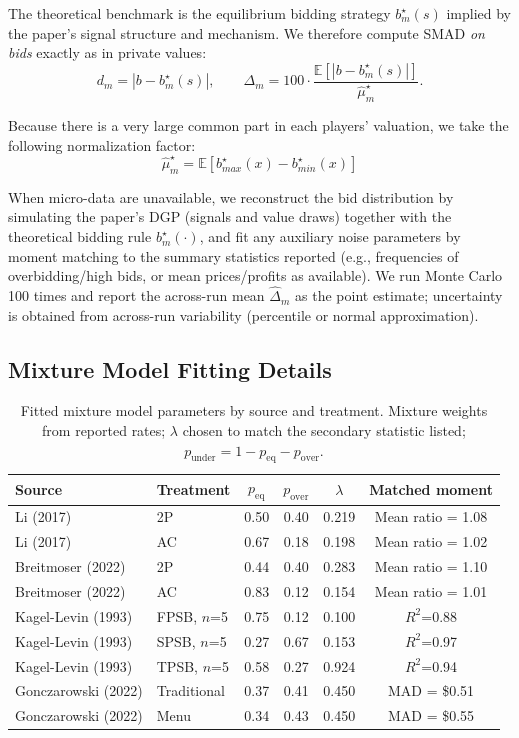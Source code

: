 \documentclass{article} %
\begin{document}
The theoretical benchmark is the equilibrium bidding strategy $b_m^\star(s)$ implied by the paper's signal structure and mechanism. We therefore compute SMAD \emph{on bids} exactly as in private values:
\[
d_m = |b - b_m^\star(s)|,
\qquad
\Delta_m = 100\cdot \frac{\mathbb E[|b-b_m^\star(s)|]}{\widehat{\mu}_m^\star}.
\]

Because there is a very large common part in each players' valuation, we take the following normalization factor:
\[
{\widehat{\mu}_m^\star} = \mathbb E[b^\star_{max}(x) - b^\star_{min}(x)]
\]

When micro-data are unavailable, we reconstruct the bid distribution by simulating the paper's DGP (signals and value draws) together with the theoretical bidding rule $b_m^\star(\cdot)$, and fit any auxiliary noise parameters by moment matching to the summary statistics reported (e.g., frequencies of overbidding/high bids, or mean prices/profits as available). We run Monte Carlo 100 times and report the across-run mean $\widehat{\Delta}_m$ as the point estimate; uncertainty is obtained from across-run variability (percentile or normal approximation).

\subsection{Mixture Model Fitting Details}\label{app:mixture}

\begin{table}[h]
\centering
\small
\begin{tabular}{llcccc}
\toprule
Source & Treatment & $p_{\text{eq}}$ & $p_{\text{over}}$ & $\lambda$ & Matched moment \\
\midrule
Li (2017) & 2P & 0.50 & 0.40 & 0.219 & Mean ratio = 1.08 \\
Li (2017) & AC & 0.67 & 0.18 & 0.198 & Mean ratio = 1.02 \\
Breitmoser (2022) & 2P & 0.44 & 0.40 & 0.283 & Mean ratio = 1.10 \\
Breitmoser (2022) & AC & 0.83 & 0.12 & 0.154 & Mean ratio = 1.01 \\
Kagel-Levin (1993) & FPSB, $n$=5 & 0.75 & 0.12 & 0.100 & $R^2$=0.88 \\
Kagel-Levin (1993) & SPSB, $n$=5 & 0.27 & 0.67 & 0.153 & $R^2$=0.97 \\
Kagel-Levin (1993) & TPSB, $n$=5 & 0.58 & 0.27 & 0.924 & $R^2$=0.94 \\
Gonczarowski (2022) & Traditional & 0.37 & 0.41 & 0.450 & MAD = \$0.51 \\
Gonczarowski (2022) & Menu & 0.34 & 0.43 & 0.450 & MAD = \$0.55 \\
\bottomrule
\end{tabular}
\caption{Fitted mixture model parameters by source and treatment. Mixture weights from reported rates; $\lambda$ chosen to match the secondary statistic listed; $p_{\text{under}} = 1 - p_{\text{eq}} -
p_{\text{over}}$.}
\label{tab:mixture_fit}
\end{table}
\end{document}
